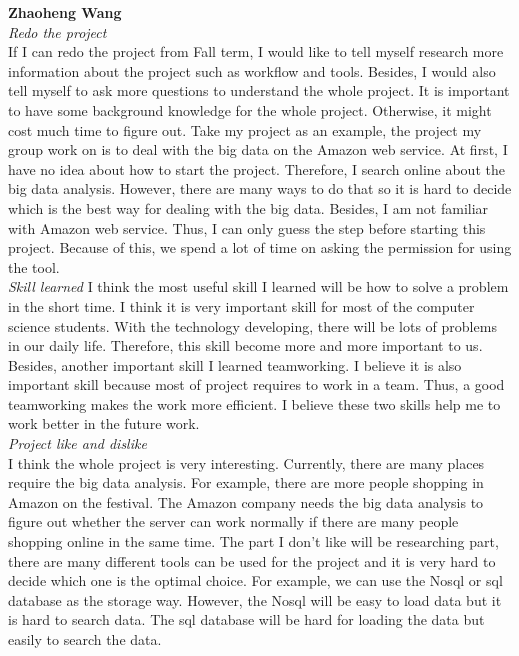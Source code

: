 \noindent\textbf{Zhaoheng Wang}\\
\noindent\textit{Redo the project}\\
If I can redo the project from Fall term, I would like to tell myself research more information about the project such as workflow and tools. Besides, I would also tell myself to ask more questions to understand the whole project. It is important to have some background knowledge for the whole project. Otherwise, it might cost much time to figure out. Take my project as an example, the project my group work on is to deal with the big data on the Amazon web service. At first, I have no idea about how to start the project. Therefore, I search online about the big data analysis. However, there are many ways to do that so it is hard to decide which is the best way for dealing with the big data. Besides, I am not familiar with Amazon web service. Thus, I can only guess the step before starting this project. Because of this, we spend a lot of time on asking the permission for using the tool.\\

\noindent\textit{Skill learned}
I think the most useful skill I learned will be how to solve a problem in the short time. I think it is very important skill for most of the computer science students. With the technology developing, there will be lots of problems in our daily life. Therefore, this skill become more and more important to us. Besides, another important skill I learned teamworking. I believe it is also important skill because most of project requires to work in a team. Thus, a good teamworking makes the work more efficient. I believe these two skills help me to work better in the future work.\\

\noindent\textit{Project like and dislike}\\
I think the whole project is very interesting. Currently, there are many places require the big data analysis. For example, there are more people shopping in Amazon on the festival. The Amazon company needs the big data analysis to figure out whether the server can work normally if there are many people shopping online in the same time. The part I don’t like will be researching part, there are many different tools can be used for the project and it is very hard to decide which one is the optimal choice. For example, we can use the Nosql or sql database as the storage way. However, the Nosql will be easy to load data but it is hard to search data. The sql database will be hard for loading the data but easily to search the data.\\

